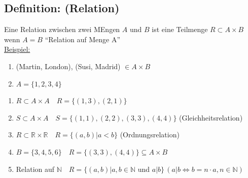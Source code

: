 \subsection{Definition: (Relation)}
Eine Relation zwischen zwei MEngen $A$ und $B$ ist eine Teilmenge $R \subset A \times B$ wenn $A=B$ "`Relation auf Menge A"'\\
\underline{Beispiel:}\\
\begin{enumerate}[label=\alph*)]
	\item (Martin, London), (Susi, Madrid) $\in A\times B$
	\item $A=\{1,2,3,4\}$
\end{enumerate}
\begin{enumerate}
	\item $R \subset A \times A \quad R=\{(1,3),(2,1)\}$
	\item $S \subset A \times A \quad S=\{(1,1),(2,2),(3,3),(4,4)\}$ (Gleichheitsrelation)
	\item $R \subset \mathbb{R}\times\mathbb{R} \quad R=\{(a,b)|a<b\}$ 
		(Ordnungsrelation)
	\item $B=\{3,4,5,6\} \quad R=\{(3,3),(4,4)\} \subseteq A\times B$
	\item Relation auf $\mathbb{N} \quad R=\{(a,b)|a,b\in\mathbb{N}$ und $a|b\} \, (a|b 
		\Leftrightarrow b=n\cdot a, n \in \mathbb{N})$
\end{enumerate}
%
%
%
